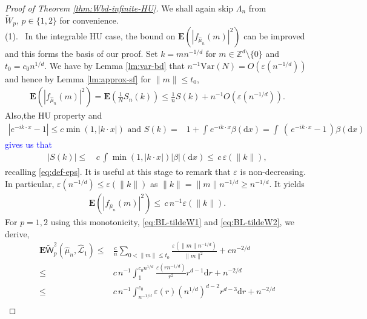\documentclass[12pt]{article}
\newcommand{\Z}{\mathbb{Z}}
\newcommand{\Leb}{\mathcal{L}}
\newcommand{\1}{\mathbf{1}}
\newcommand{\md}{\mathrm{d}}
\newcommand{\var}{\text{Var}}
\newcommand{\dy}[1]{\textcolor{blue}{#1}}
\newcommand{\dy}[1]{#1}%
\begin{document}
{{{{{\begin{proof}[Proof of Theorem \ref{thm:Wbd-infinite-HU}]

We shall again skip $\Lambda_n$ from $\tilde{W}_p, \, p \in  \{1,2\}$ for convenience. \\

\noindent (1). \, In the integrable HU case, the bound on $ \mathbf{E}( | f_{ \hat \mu _{n}} (m)| ^{2})$ can be improved and this forms the basis of our proof. {Set $k = mn^{-1/d}$ for $m \in \Z^d \setminus \{0\}$} {and $t_0 = c_0n^{1/d}$}. We have by {Lemma \ref{lm:var-bd} that $ n^{-1}\var(N)= O(\varepsilon (n^{-1/d}))$ and hence by Lemma \ref{lm:approx-sf} for $\|m\| \leq t_0$,}
\begin{align}
\label{eq:claim-eps}
\mathbf{E}(| f_{ \hat \mu_{n} }(m) | ^{2})=
\mathbf{E}\left( \frac{ 1}{N}S_{n}(k) \right) \leqslant  \frac{ 1}{n}S(k)+ n^{-1}O(\varepsilon (n^{-1/d})).
\end{align}
Also,the HU property and %
\begin{align*}
 | e^{-ik\cdot x}-1 | \leqslant c \min(1, | k\cdot x | ) \, \, \textrm{and} \, \, S(k)= &1+\int_{}e^{-ik\cdot x}\beta (\md x)=   \int_{} \,( \, e^{-ik\cdot x} - 1 \, )\beta (\md x)
 \end{align*}
\dy{ gives us that}
%
 \begin{align*}
 | S(k) | \leqslant  & \, c \, \int_{}\min(1, | k\cdot x | ) | \beta  | (\md x) \leqslant \, c \, \varepsilon (\| k \|  ),
\end{align*}
%
recalling  \eqref{eq:def-eps}.
It is useful at this stage to remark that $ \varepsilon $ is non-decreasing.
In particular, $ \varepsilon (n^{-1/d})\leqslant \varepsilon (\| k \| )$  {as $\|k\| = \| m \|n^{-1/d} \geqslant  n^{-1/d}$}. It yields
%
\begin{align*}\mathbf{E}(| f_{ \hat \mu_{n} }(m) | ^{2})\leqslant \, c \, n^{-1}\varepsilon ( \| k \| ).
\end{align*}
%
 {For $p=1,2$ using this monotonicity, \eqref{eq:BL-tildeW1} and \eqref{eq:BL-tildeW2}, we derive},
\begin{align*}
\mathbf{E} \widetilde{   \mathsf W}^{2}_{p}(\hat \mu _{n},\hat{\Leb}_1)
 \leqslant & {\frac{c}{n}\sum_{0< \| m \| \leqslant t_0} \frac{ \varepsilon (\|m\|n^{-1/d})}{\|m\|^{2}}}+cn^{-2/d}\\
\leqslant & c \, n^{-1 }{\int_{1}^{c_{0}n^{1/d}} \frac{\varepsilon (rn^{-1/d})}{r^{2}}r^{d-1}\md r} + n^{-2/d}\\
\leqslant &c \, n^{-1}{\int_{n^{-1/d}}^{c_{0}} { \varepsilon (r)} (n^{1/d})^{d-2}r^{d-3}\md r }+n^{-2/d}\\

\end{align*}
\end{proof}}}}}}
\end{document}
